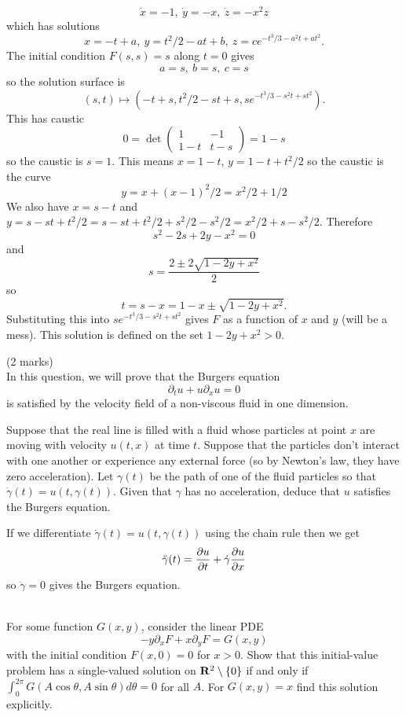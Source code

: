 \documentclass[12pt]{article}
\begin{document}
\begin{answer}
\begin{enumerate}[(a)]
\[\dot{x}=-1,\ \dot{y}=-x,\ \dot{z}=-x^2z\]
which has solutions
\[x=-t+a,\ y=t^2/2-at+b,\ z=ce^{-t^3/3-a^2t+at^2}.\]
The initial condition $F(s,s)=s$ along $t=0$ gives
\[a=s,\ b=s,\ c=s\]
so the solution surface is
\[(s,t)\mapsto (-t+s,t^2/2-st+s,se^{-t^3/3-s^2t+st^2}).\]
This has caustic
\[0=\det\left(\begin{array}{cc}
1 & -1\\
1-t & t-s
\end{array}\right)=1-s\]
so the caustic is $s=1$. This means $x=1-t$, $y=1-t+t^2/2$ so the caustic is the curve
\[y=x+(x-1)^2/2=x^2/2+1/2\]
We also have $x=s-t$ and $y=s-st+t^2/2=s-st+t^2/2+s^2/2-s^2/2=x^2/2+s-s^2/2$. Therefore
\[s^2-2s+2y-x^2=0\]
and
\[s=\frac{2\pm 2\sqrt{1-2y+x^2}}{2}\]
so
\[t=s-x=1-x\pm \sqrt{1-2y+x^2}.\]
Substituting this into $se^{-t^3/3-s^2t+st^2}$ gives $F$ as a function of $x$ and $y$ (will be a mess). This solution is defined on the set $1-2y+x^2>0$.
\end{enumerate}
\end{answer}

\newpage

\begin{question}(2 marks)\\
In this question, we will prove that the Burgers equation
\[\partial_tu+u\partial_xu=0\]
is satisfied by the velocity field of a non-viscous fluid in one dimension.

Suppose that the real line is filled with a fluid whose particles at point $x$ are moving with velocity $u(t,x)$ at time $t$. Suppose that the particles don't interact with one another or experience any external force (so by Newton's law, they have zero acceleration). Let $\gamma(t)$ be the path of one of the fluid particles so that $\dot{\gamma}(t)=u(t,\gamma(t))$. Given that $\gamma$ has no acceleration, deduce that $u$ satisfies the Burgers equation.
\end{question}

\begin{answer}
If we differentiate $\dot{\gamma}(t)=u(t,\gamma(t))$ using the chain rule then we get
\[\ddot{\gamma}(t)=\dfrac{\partial u}{\partial t}+\dot{\gamma}\dfrac{\partial u}{\partial x}\]
so $\ddot{\gamma}=0$ gives the Burgers equation.
\end{answer}
\newpage

\bigskip

\begin{question}\ \\
For some function $G(x,y)$, consider the linear PDE
\[-y\partial_xF+x\partial_yF=G(x,y)\]
with the initial condition $F(x,0)=0$ for $x>0$. Show that this initial-value problem has a single-valued solution on $\mathbf{R}^2\setminus\{0\}$ if and only if $\int_0^{2\pi}G(A\cos\theta,A\sin\theta)d\theta=0$ for all $A$. For $G(x,y)=x$ find this solution explicitly.
\end{question}
\end{document}
